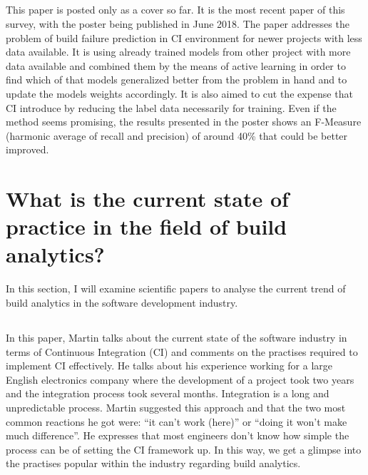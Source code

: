 \documentclass[]{book}
\begin{document}
\subsection{\texorpdfstring{\citet{ni2018acona}}{@ni2018acona}}\label{ni2018acona}

This paper is posted only as a cover so far. It is the most recent paper
of this survey, with the poster being published in June 2018. The paper
addresses the problem of build failure prediction in CI environment for
newer projects with less data available. It is using already trained
models from other project with more data available and combined them by
the means of active learning in order to find which of that models
generalized better from the problem in hand and to update the models
weights accordingly. It is also aimed to cut the expense that CI
introduce by reducing the label data necessarily for training. Even if
the method seems promising, the results presented in the poster shows an
F-Measure (harmonic average of recall and precision) of around 40\% that
could be better improved.

\section{What is the current state of practice in the field of build
analytics?}\label{what-is-the-current-state-of-practice-in-the-field-of-build-analytics}

In this section, I will examine scientific papers to analyse the current
trend of build analytics in the software development industry.

\subsection{\texorpdfstring{\citet{fowler2006continuous}}{@fowler2006continuous}}\label{fowler2006continuous}

In this paper, Martin talks about the current state of the software
industry in terms of Continuous Integration (CI) and comments on the
practises required to implement CI effectively. He talks about his
experience working for a large English electronics company where the
development of a project took two years and the integration process took
several months. Integration is a long and unpredictable process. Martin
suggested this approach and that the two most common reactions he got
were: ``it can't work (here)'' or ``doing it won't make much
difference''. He expresses that most engineers don't know how simple the
process can be of setting the CI framework up. In this way, we get a
glimpse into the practises popular within the industry regarding build
analytics.
\end{document}
